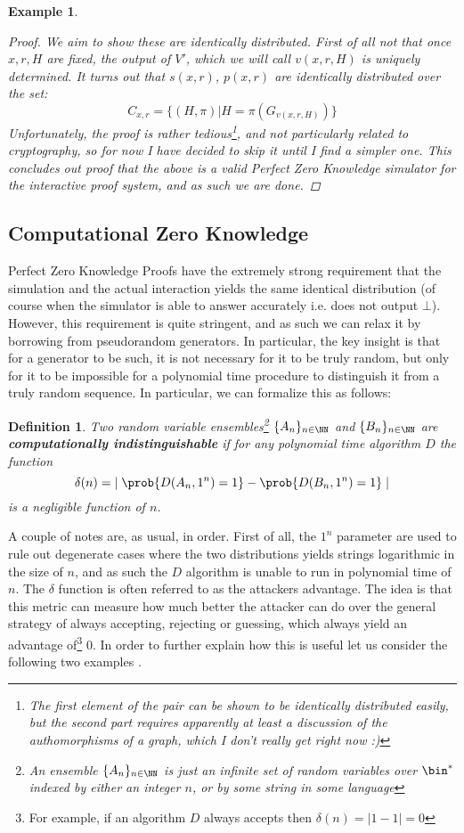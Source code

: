 \documentclass{article}
\newtheorem{definition}{Definition}
\newtheorem{example}{Example}
\begin{document}
\begin{example}
\begin{proof}
        We aim to show these are identically distributed. First of all not that once $x,r,H$ are fixed, the output of $V'$, which we will call $v(x,r,H)$ is uniquely determined.
        It turns out that $s(x,r)$, $p(x,r)$ are identically distributed over the set:
        \[ C_{x,r} = \{ (H, \pi) | H = \pi(G_{v(x,r,H)}) \} \]
        Unfortunately, the proof is rather tedious\footnote{The first element of the pair can be shown to be identically distributed easily, but the second part requires apparently at least a discussion of the authomorphisms of a graph, which I don't really get right now :)}, and not particularly related to cryptography, so for now I have decided to skip it until I find a simpler one.
        This concludes out proof that the above is a valid Perfect Zero Knowledge simulator for the interactive proof system, and as such we are done.
        \end{proof}
\end{example}

\subsection{Computational Zero Knowledge}
Perfect Zero Knowledge Proofs have the extremely strong requirement that the simulation and the actual interaction yields the same identical distribution (of course when the simulator is able to answer accurately i.e. does not output $\bot$). However, this requirement is quite stringent, and as such we can relax it by borrowing from pseudorandom generators. In particular, the key insight is that for a generator to be such, it is not necessary for it to be truly random, but only for it to be impossible for a polynomial time procedure to distinguish it from a truly random sequence. In particular, we can formalize this as follows:
\begin{definition}
Two random variable ensembles\footnote{An ensemble $\{A_n\}_{n \in \NN}$ is just an infinite set of random variables over $\bin^*$ indexed by either an integer $n$, or by some string in some language} $\{A_n\}_{n \in \NN}$ and $\{B_n\}_{n \in \NN}$ are \textbf{computationally indistinguishable} if for any polynomial time algorithm $D$ the function
\[ \delta(n) = \left| \; \prob{D(A_n, 1^n) = 1} - \prob{D(B_n, 1^n) = 1} \;  \right|  \] is a negligible function of $n$.
\end{definition}
A couple of notes are, as usual, in order. First of all, the $1^n$ parameter are used to rule out degenerate cases where the two distributions yields strings logarithmic in the size of $n$, and as such the $D$ algorithm is unable to run in polynomial time of $n$. The $\delta$ function is often referred to as the attackers advantage. The idea is that this metric can measure how much better the attacker can do over the general strategy of always accepting, rejecting or guessing, which always yield an advantage of\footnote{For example, if an algorithm $D$ always accepts then $\delta(n) = |1 - 1| = 0$} 0. 
In order to further explain how this is useful let us consider the following two examples \cite{ProvableSecurityComputational}.
\end{document}
